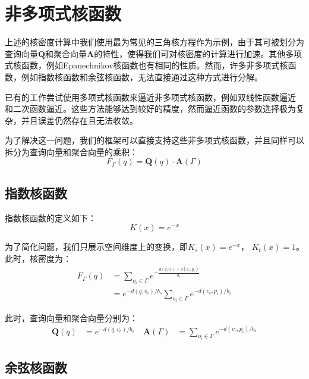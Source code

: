 \section{非多项式核函数}
\label{sec7:kernel}

上述的核密度计算中我们使用最为常见的三角核方程作为示例，由于其可被划分为查询向量$\mathbf{Q}$和聚合向量$\mathbf{A}$的特性，使得我们可对核密度的计算进行加速。其他多项式核函数，例如Epanechnikov核函数也有相同的性质。然而，许多非多项式核函数，例如指数核函数和余弦核函数，无法直接通过这种方式进行分解。

已有的工作尝试使用多项式核函数来逼近非多项式核函数，例如双线性函数逼近 \cite{chan_karl_2019} 和二次函数逼近\cite{chan_quad_2020}。这些方法能够达到较好的精度，然而逼近函数的参数选择极为复杂，并且误差仍然存在且无法收敛。

为了解决这一问题，我们的框架可以直接支持这些非多项式核函数，并且同样可以拆分为查询向量和聚合向量的乘积：
\begin{equation*}
	F_\Gamma(q)= \mathbf{Q}(q) \cdot \mathbf{A}(\Gamma)
\end{equation*}



\subsection{指数核函数}

指数核函数的定义如下：
\begin{equation*}
	K(x) = e^{-x}
\end{equation*}

为了简化问题，我们只展示空间维度上的变换，即$K_s(x) = e^{-x}$， $K_t(x) = 1$。此时，核密度为：
\begin{equation*}
\begin{aligned}
	F_{\Gamma}(q) &= \sum_{o_i \in \Gamma} e^{-\frac{d(q, v_c) + d(v_c, p_i)}{b_s}} \\
	&= e^{-d(q, v_c)/b_s} \sum_{o_i \in \Gamma} e^{-d(v_c, p_i)/b_s}
\end{aligned}
\end{equation*}

此时，查询向量和聚合向量分别为：
\begin{equation*}
\begin{aligned}
	\mathbf{Q}(q) &= e^{-d(q, v_c)/b_s} \quad
	\mathbf{A}(\Gamma) &= \sum_{o_i \in \Gamma} e^{-d(v_c, p_i)/b_s}
\end{aligned}
\end{equation*} 

\subsection{余弦核函数}


